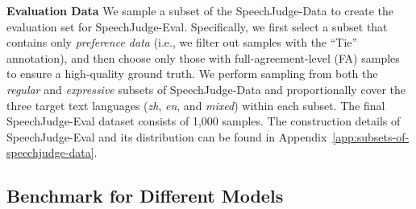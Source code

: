 \documentclass[]{bytedance_seed}
\begin{document}
\textbf{Evaluation Data}\quad
We sample a subset of the SpeechJudge-Data to create the evaluation set for SpeechJudge-Eval. Specifically, we first select a subset that contains only \textit{preference data} (i.e., we filter out samples with the ``Tie'' annotation), and then choose only those with full-agreement-level (FA) samples to ensure a high-quality ground truth. We perform sampling from both the \textit{regular} and \textit{expressive} subsets of SpeechJudge-Data and proportionally cover the three target text languages (\textit{zh}, \textit{en}, and \textit{mixed}) within each subset. The final SpeechJudge-Eval dataset consists of 1,000 samples. The construction details of SpeechJudge-Eval and its distribution can be found in Appendix~\ref{app:subsets-of-speechjudge-data}.

\subsection{Benchmark for Different Models}
\end{document}
